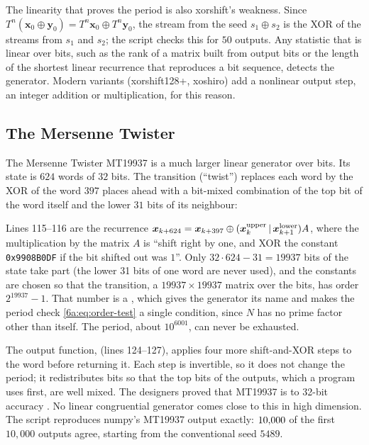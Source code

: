 The linearity that proves the period is also xorshift's weakness. Since $T^n(\bm x_0\oplus\bm y_0)=
T^n\bm x_0\oplus T^n\bm y_0$, the stream from the seed $s_1\oplus s_2$ is the XOR of
the streams from $s_1$ and $s_2$; the script checks this for $50$ outputs. Any
statistic that is linear over bits, such as the rank of a matrix built from output
bits or the length of the shortest linear recurrence that reproduces a bit
sequence, detects the generator. Modern variants (xorshift128+, xoshiro) add a
nonlinear output step, an integer addition or multiplication, for this reason.

\subsection{The Mersenne Twister}

The Mersenne Twister MT19937 \cite{MatsumotoNishimura1998} is a much larger linear
generator over bits. Its state is $624$ words of $32$ bits. The transition
(``twist'') replaces each word by the XOR of the word $397$ places ahead with a
bit-mixed combination of the top bit of the word itself and the lower $31$ bits of
its neighbour:


Lines 115--116 are the recurrence
$\bm x_{k+624}=\bm x_{k+397}\oplus(\bm x_k^{\rm upper}\,|\,\bm x_{k+1}^{\rm lower})A$,
where the multiplication by the matrix $A$ is ``shift right by one, and XOR the
constant \texttt{0x9908B0DF} if the bit shifted out was $1$''. Only $32\cdot624-31=
19937$ bits of the state take part (the lower 31 bits of one word are never used),
and the constants are chosen so that the transition, a $19937\times19937$ matrix over
the bits, has order $2^{19937}-1$. That number is a 
, which gives the generator its name and makes the
period check \eqref{6a:eq:order-test} a single condition, since $N$ has no prime
factor other than itself. The period, about $10^{6001}$, can never be exhausted.

The output function,  (lines 124--127), applies four more
shift-and-XOR steps to the word before returning it. Each step is invertible, so it does
not change the period; it redistributes bits so that the top bits of the outputs,
which a program uses first, are well mixed. The designers proved that MT19937 is
 to 32-bit accuracy . No linear congruential
generator comes close to this in high dimension. The script reproduces numpy's
MT19937 output exactly: $10{,}000$ of the first $10{,}000$ outputs agree, starting
from the conventional seed $5489$.

